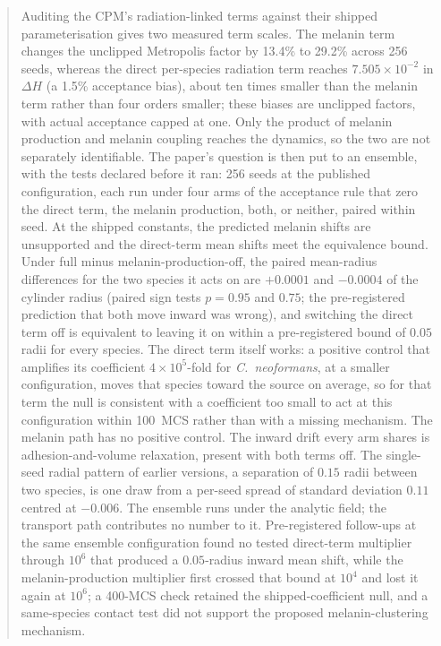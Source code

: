 \documentclass[11pt]{article}
\begin{document}
\begin{abstract}
Auditing the CPM's radiation-linked terms against their shipped parameterisation gives two
measured term scales. The melanin term changes the unclipped Metropolis factor by 13.4\% to 29.2\% across 256 seeds, whereas
the direct per-species radiation term reaches $7.505\times10^{-2}$ in $\Delta H$ (a 1.5\% acceptance bias), about ten
times smaller than the melanin term rather than four orders smaller; these biases are unclipped factors, with actual acceptance capped at one. Only the product of melanin production and melanin
coupling reaches the dynamics, so the two are not separately identifiable. The paper's question is
then put to an ensemble, with the tests declared before it ran: 256 seeds at the published
configuration, each run under four arms of the acceptance rule that zero the direct term, the
melanin production, both, or neither, paired within seed. At the shipped constants, the predicted melanin shifts are unsupported and the direct-term mean shifts meet the equivalence bound. Under full minus
melanin-production-off, the paired mean-radius differences for the two species it acts on are $+0.0001$ and
$-0.0004$ of the cylinder radius (paired sign tests $p = 0.95$ and $0.75$; the pre-registered
prediction that both move inward was wrong), and switching the direct term off is equivalent to
leaving it on within a pre-registered bound of $0.05$ radii for every species. The direct term itself works: a positive control that amplifies its coefficient $4\times10^{5}$-fold for \textit{C.~neoformans}, at a smaller configuration, moves that species toward the source on average, so for that term the null is consistent with a coefficient too small to act at this configuration within 100~MCS rather than with a missing mechanism. The melanin path has no positive control. The inward drift
every arm shares is adhesion-and-volume relaxation, present with both terms off. The single-seed
radial pattern of earlier versions, a separation of $0.15$ radii between two species, is one draw
from a per-seed spread of standard deviation $0.11$ centred at $-0.006$. The ensemble runs under the
analytic field; the transport path contributes no number to it. Pre-registered follow-ups at the
same ensemble configuration found no tested direct-term multiplier through $10^6$ that produced a
$0.05$-radius inward mean shift, while the melanin-production multiplier first crossed that bound
at $10^4$ and lost it again at $10^6$; a 400-MCS check retained the shipped-coefficient null, and a
same-species contact test did not support the proposed melanin-clustering mechanism.


\end{abstract}
\end{document}
